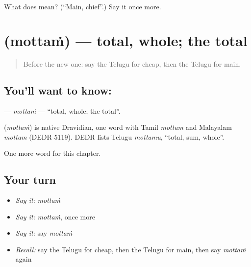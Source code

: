 \begin{tcolorbox}[breakable,colback=teal!4,colframe=teal!35!black,title={Before you move on}]
What does  mean? (\textquotedblleft{}Main, chief\textquotedblright{}.) Say it once more.
\end{tcolorbox}
\section[\texorpdfstring{\te{మొత్తం} (mottaṁ)}{మొత్తం (mottaṁ)}]{ (mottaṁ) — total, whole; the total}

\label{lesson:TE-C180-mottam}



\begin{quote}
Before the new one: say the Telugu for cheap, then the Telugu for main.
\end{quote}

\subsection*{You'll want to know: }
\textbf{} — \emph{mottaṁ} — \textquotedblleft{}total, whole; the total\textquotedblright{}.

\begin{cousinweb}
\textbf{} (\emph{mottaṁ}) is native Dravidian, one word with Tamil \emph{mottam} and Malayalam \emph{mottam} (DEDR 5119). DEDR lists Telugu \emph{mottamu}, \textquotedblleft{}total, sum, whole\textquotedblright{}.
\end{cousinweb}

\begin{grammarlens}[title={What you've built}]
One more word for this chapter.
\end{grammarlens}

\subsection*{Your turn}
\begin{itemize}
\raggedright
  \item \emph{Say it:} \emph{mottaṁ}
  \item \emph{Say it:} \emph{mottaṁ}, once more
  \item \emph{Say it:} say \emph{mottaṁ}
  \item \emph{Recall:} say the Telugu for cheap, then the Telugu for main, then say \emph{mottaṁ} again
\end{itemize}

